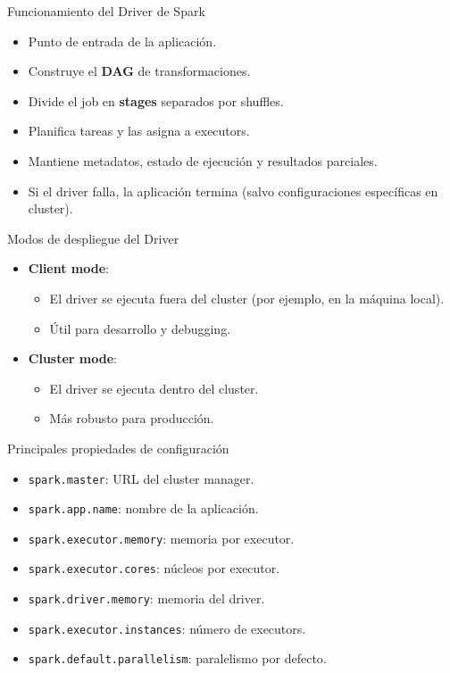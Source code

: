 \documentclass{beamer}
\begin{document}
\begin{frame}{Funcionamiento del Driver de Spark}
\begin{itemize}
  \item Punto de entrada de la aplicación.
  \item Construye el \textbf{DAG} de transformaciones.
  \item Divide el job en \textbf{stages} separados por shuffles.
  \item Planifica tareas y las asigna a executors.
  \item Mantiene metadatos, estado de ejecución y resultados parciales.
  \item Si el driver falla, la aplicación termina (salvo configuraciones específicas en cluster).
\end{itemize}
\end{frame}

\begin{frame}{Modos de despliegue del Driver}
\begin{itemize}
  \item \textbf{Client mode}:
  \begin{itemize}
    \item El driver se ejecuta fuera del cluster (por ejemplo, en la máquina local).
    \item Útil para desarrollo y debugging.
  \end{itemize}
  \item \textbf{Cluster mode}:
  \begin{itemize}
    \item El driver se ejecuta dentro del cluster.
    \item Más robusto para producción.
  \end{itemize}
\end{itemize}
\end{frame}

\begin{frame}{Principales propiedades de configuración}
\begin{itemize}
  \item \texttt{spark.master}: URL del cluster manager.
  \item \texttt{spark.app.name}: nombre de la aplicación.
  \item \texttt{spark.executor.memory}: memoria por executor.
  \item \texttt{spark.executor.cores}: núcleos por executor.
  \item \texttt{spark.driver.memory}: memoria del driver.
  \item \texttt{spark.executor.instances}: número de executors.
  \item \texttt{spark.default.parallelism}: paralelismo por defecto.
\end{itemize}
\end{frame}
\end{document}
